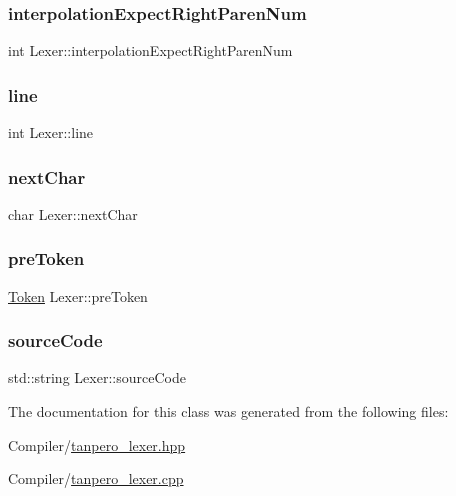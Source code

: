 \mbox{\label{class_lexer_aa9c1cbb2a3e7e13cdd9a2004db26b2b1}} 
\subsubsection{\texorpdfstring{interpolationExpectRightParenNum}{interpolationExpectRightParenNum}}
{\footnotesize\ttfamily int Lexer\+::interpolation\+Expect\+Right\+Paren\+Num}

\mbox{\label{class_lexer_a35d0802ee5cced4c5294fb6dc77ad2f4}} 
\subsubsection{\texorpdfstring{line}{line}}
{\footnotesize\ttfamily int Lexer\+::line}

\mbox{\label{class_lexer_aae947741e1e4766d1a8028712fe2f266}} 
\subsubsection{\texorpdfstring{nextChar}{nextChar}}
{\footnotesize\ttfamily char Lexer\+::next\+Char}

\mbox{\label{class_lexer_aaa6452328e54f01df81b4c46c2dafdfc}} 
\subsubsection{\texorpdfstring{preToken}{preToken}}
{\footnotesize\ttfamily \mbox{\hyperlink{struct_token}{Token}} Lexer\+::pre\+Token}

\mbox{\label{class_lexer_a028378af5c43831b7a6dc459ea46c840}} 
\subsubsection{\texorpdfstring{sourceCode}{sourceCode}}
{\footnotesize\ttfamily std\+::string Lexer\+::source\+Code}



The documentation for this class was generated from the following files\+:\begin{DoxyCompactItemize}
\item 
Compiler/\mbox{\hyperlink{tanpero__lexer_8hpp}{tanpero\+\_\+lexer.\+hpp}}\item 
Compiler/\mbox{\hyperlink{tanpero__lexer_8cpp}{tanpero\+\_\+lexer.\+cpp}}\end{DoxyCompactItemize}
